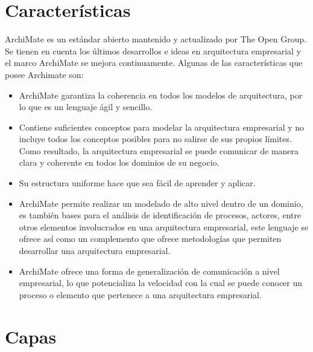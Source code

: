 {	\section{Características}	
	ArchiMate es un  estándar abierto  mantenido y actualizado por The Open Group. Se tienen en cuenta los últimos desarrollos e ideas en arquitectura empresarial y el marco ArchiMate se mejora continuamente. Algunas de las características que posee Archimate son:
    \begin{itemize}
        \item ArchiMate garantiza la coherencia en todos los modelos de arquitectura, por lo que es un lenguaje ágil y sencillo. 
        \item Contiene suficientes conceptos para modelar la arquitectura empresarial y no incluye todos los conceptos posibles para no salirse de sus propios límites. Como resultado, la arquitectura empresarial se puede comunicar de manera clara y coherente en todos los dominios de su negocio. 
        \item Su estructura uniforme hace que sea fácil de aprender y aplicar.
        \item ArchiMate permite realizar un modelado de alto nivel dentro de un dominio, es también bases para el análisis de identificación de procesos, actores, entre otros elementos involucrados en una arquitectura empresarial, este lenguaje se ofrece así como un complemento que ofrece metodologías que permiten desarrollar una arquitectura empresarial.
        \item ArchiMate ofrece una forma de generalización de comunicación a nivel empresarial, lo que potencializa la velocidad con la cual se puede conocer un proceso o elemento que pertenece a una arquitectura empresarial.
    \end{itemize}
    
    \section{Capas}
	
	
	
	
    
	
	
	
	
}